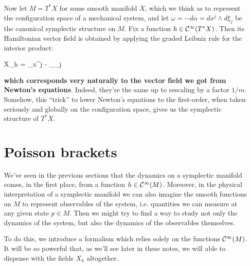 \documentclass[main.tex]{subfiles}
\begin{document}
Now let $M=T^*X$ for some smooth manifold $X$, which we think as to represent the configuration space of a mechanical system, and let $\omega = -d\alpha = dx^j \wedge d\xi_j$ be the canonical symplectic structure on $M$. Fix a function $h \in \mathcal{C}^\infty(T^*X)$. Then its Hamiltonian vector field is obtained by applying the graded Leibniz rule for the interior product\footnotemark:
\begin{eqalign}
	X_h =  \partial_{x^j} - \partial_{\xi_j}
\end{eqalign}
\textbf{which corresponds very naturally to the vector field we got from Newton's equations}. Indeed, they're the same up to rescaling by a factor $1/m$. Somehow, this ``trick'' to lower Newton's equations to the first-order, when taken seriously and globally on the configuration space, gives us the symplectic structure of $T^* X$.

\section{Poisson brackets}
We've seen in the previous sections that the dynamics on a symplectic manifold comes, in the first place, from a function $h \in \mathcal{C}^\infty(M)$. Moreover, in the physical interpretation of a symplectic manifold we can also imagine the smooth functions on $M$ to represent observables of the system, i.e. quantities we can measure at any given state $p \in M$. Then we might try to find a way to study not only the dynamics of the system, but also the dynamics of the observables themselves.

To do this, we introduce a formalism which relies solely on the functions $\mathcal{C}^\infty(M)$. It will be so powerful that, as we'll see later in these notes, we will able to dispense with the fields $X_h$ altogether.
\end{document}
